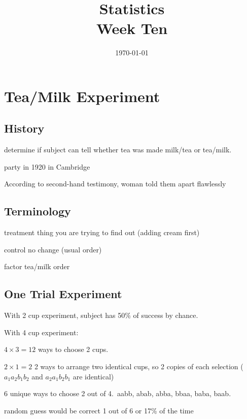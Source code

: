 \documentclass[landscape]{exam}
\title{Statistics \\ Week Ten}
\date{\today}
\author{}
\begin{document}
  \maketitle
  \tableofcontents

  \section{Tea/Milk Experiment}

  \subsection{History}
  \begin{itemize*}
    \item determine if subject can tell whether tea was made milk/tea or tea/milk.

    \item party in 1920 in Cambridge

    \item According to second-hand testimony, woman told them apart flawlessly

  \end{itemize*}

  \subsection{Terminology}
  \begin{description*}
    \item[treatment] thing you are trying to find out (adding cream first)
    \item[control] no change (usual order)
    \item[factor] tea/milk order
  \end{description*}

  \subsection{One Trial Experiment}
  With 2 cup experiment, subject has 50\% of success by chance.

  With 4 cup experiment:
  \begin{itemize*}
    \item $4 \times 3 = 12$ ways to choose 2 cups.  

    \item $2 \times 1 = 2$ 2 ways to arrange two identical cups, so 2 copies of
      each selection ($a_1a_2b_1b_2$ and $a_2a_1b_2b_1$ are identical)

    \item 6 unique ways to choose 2 out of 4.\ aabb, abab, abba, bbaa,
      baba, baab.
    \item random guess would be correct 1 out of 6 or 17\% of the time
  \end{itemize*}
\end{document}
